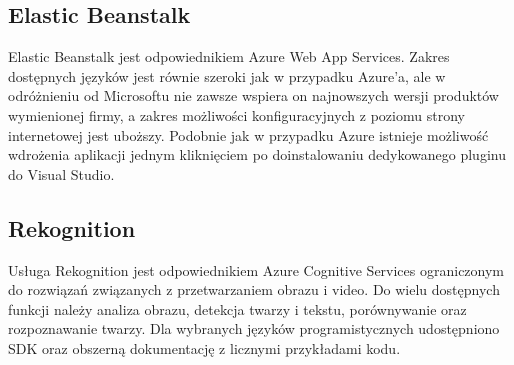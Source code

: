 \subsection{Elastic Beanstalk}
Elastic Beanstalk jest odpowiednikiem Azure Web App Services. Zakres dostępnych języków jest równie szeroki jak w przypadku Azure'a, ale w odróżnieniu od Microsoftu nie zawsze wspiera on najnowszych wersji produktów wymienionej firmy, a zakres możliwości konfiguracyjnych z poziomu strony internetowej jest uboższy. Podobnie jak w przypadku Azure istnieje możliwość wdrożenia aplikacji jednym kliknięciem po doinstalowaniu dedykowanego pluginu do Visual Studio.
\subsection{Rekognition}
Usługa Rekognition jest odpowiednikiem Azure Cognitive Services ograniczonym do rozwiązań związanych z przetwarzaniem obrazu i video. Do wielu dostępnych funkcji należy analiza obrazu, detekcja twarzy i tekstu, porównywanie oraz rozpoznawanie twarzy. Dla wybranych języków programistycznych udostępniono SDK oraz obszerną dokumentację z licznymi przykładami kodu.